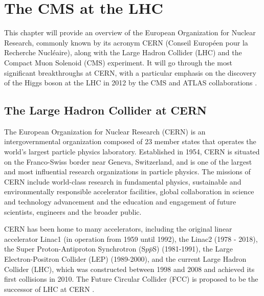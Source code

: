\chapter[The CMS at the LHC]{The CMS at the LHC}\label{chap:CMS_LHC}

This chapter will provide an overview of the European Organization for Nuclear Research, commonly known by its acronym CERN (Conseil Européen pour la Recherche Nucléaire), along with the Large Hadron Collider (LHC) and the Compact Muon Solenoid (CMS) experiment. It will go through the most significant breakthroughs at CERN, with a particular emphasis on the discovery of the Higgs boson at the LHC in 2012 by the CMS and ATLAS collaborations \cite{CMS:2012qbp,ATLAS:2012yve}.

\section{The Large Hadron Collider at CERN}\label{sec:LHC}

The European Organization for Nuclear Research (CERN) is an intergovernmental organization composed of 23 member states that operates the world's largest particle physics laboratory. Established in 1954, CERN is situated on the Franco-Swiss border near Geneva, Switzerland, and is one of the largest and most influential research organizations in particle physics. The missions of CERN include world-class research in fundamental physics, sustainable and environmentally responsible accelerator facilities, global collaboration in science and technology advancement and the education and engagement of future scientists, engineers and the broader public.

CERN has been home to many accelerators, including the original linear accelerator Linac1 (in operation from 1959 until 1992), the Linac2 (1978 - 2018), the Super Proton-Antiproton Synchrotron (S$p\bar{p}$S) (1981-1991), the Large Electron-Positron Collider (LEP) (1989-2000), and the current Large Hadron Collider (LHC), which was constructed between 1998 and 2008 and achieved its first collisions in 2010. The Future Circular Collider (FCC) is proposed to be the successor of LHC at CERN \cite{FCC:2018byv}.

